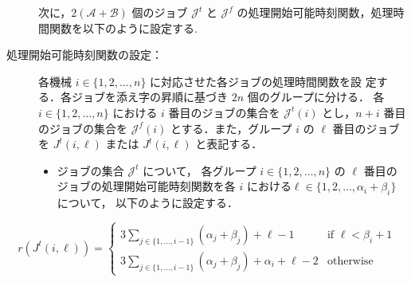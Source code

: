 \documentclass[12pt]{optlab-bachelor}
\begin{document}
\begin{description}
  \item[] 次に，$2(\mathcal{A} + \mathcal{B})$ 個のジョブ $\mathcal{J}^t$ と $\mathcal{J}^f$ の処理開始可能時刻関数，処理時間関数を以下のように設定する.
  \item[処理開始可能時刻関数の設定：] 各機械 $i \in \{1,2,\ldots,n\}$ に対応させた各ジョブの処理時間関数を設
  定する．各ジョブを添え字の昇順に基づき $2n$ 個のグループに分ける． 各 $i
  \in \{1,2,\ldots,n\}$ における $i$ 番目のジョブの集合を
  $\mathcal{J}^t(i)$ とし，$n + i$ 番目のジョブの集合を
  $\mathcal{J}^f(i)$ とする．また，グループ $i$ の $\ell$ 番目のジョブ
  を $J^t(i,\ell)$ または $J^t(i,\ell)$ と表記する．
  \begin{itemize}
    \item ジョブの集合 $\mathcal{J}^t$ について， 各グループ $i \in
    \{1,2,\ldots, n\}$ の $\ell$ 番目のジョブの処理開始可能時刻関数を各
    $i$ における$\ell \in \{1,2,\ldots, \alpha_i + \beta_i\}$ について，
    以下のように設定する．
  \end{itemize}
\end{description}
\begin{displaymath}
  r(J^t(i,\ell)) =
  \left\{ \begin{array}{lll} 3\displaystyle
  \sum_{j \in \{1,\ldots,i - 1\}}(\alpha_j + \beta_j) + \ell - 1 &
  \text{if } \ell < \beta_i + 1 \\ 3 \displaystyle \sum_{j \in \{1,\ldots,i - 1\}}(\alpha_j + \beta_j) + \alpha_i + \ell - 2 & \text{otherwise} \end{array} \right.
\end{displaymath}
\end{document}
